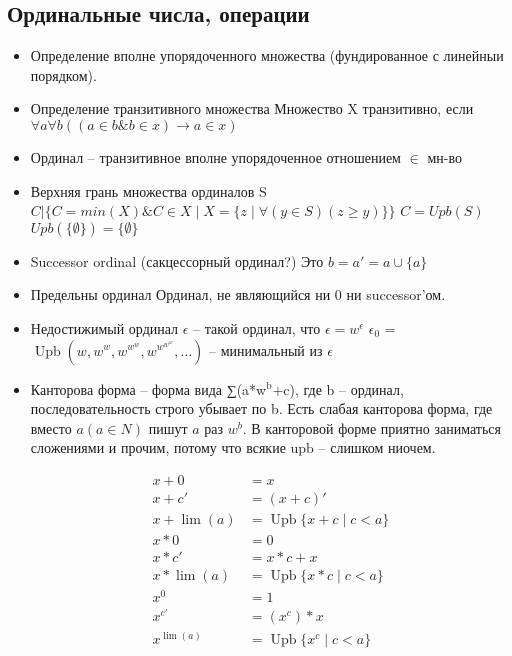 \subsection{Ординальные числа, операции}
\label{sec-2-41}
\begin{itemize}
\item Определение вполне упорядоченного множества (фундированное
с линейныи порядком).
\item Определение транзитивного множества
Множество X транзитивно, если
$\forall a \forall b((a \in b \& b \in x) \to a \in x)$
\item Ординал -- транзитивное вполне упорядоченное отношением $\in$ мн-во
\item Верхняя грань множества ординалов S
$C | \{C = min(X) \& C \in X \mid X = \{z \mid \forall (y\in S)(z \ge y)\}\}$
$C = Upb(S)$
$Upb(\{\emptyset\}) = \{\emptyset\}$
\item Successor ordinal (сакцессорный ординал?)
Это $b = a' = a \cup \{a\}$
\item Предельны ординал
Ординал, не являющийся ни 0 ни successor'ом.
\item Недостижимый ординал
$\epsilon$ -- такой ординал, что $\epsilon  = w^\epsilon $
$\epsilon_0$ = $\operatorname{Upb}(w, w^w, w^{w^w}, w^{w^{w^w}}, \dotsc)$ -- минимальный из $\epsilon$
\item Канторова форма -- форма вида ∑(a*w$^{\text{b}}$+c), где b -- ординал, последовательность
строго убывает по b. Есть слабая канторова форма, где вместо $a (a \in N)$
пишут $a$ раз $w^b$. В канторовой форме приятно заниматься сложениями и
прочим, потому что всякие upb -- слишком ниочем.

\begin{align*}
x + 0      &= x \\
x + c'     &= (x + c)' \\
x + \lim(a) &= \operatorname{Upb}\{x + c \mid c < a\} \\
x * 0      &= 0 \\
x * c'     &= x * c + x \\
x * \lim(a) &= \operatorname{Upb}\{x * c \mid c < a\} \\
x ^ 0      &= 1 \\
x ^ {c'}     &= (x ^ c) * x \\
x ^ {\lim(a)} &= \operatorname{Upb}\{x ^ c \mid c < a\}
\end{align*}
\end{itemize}
